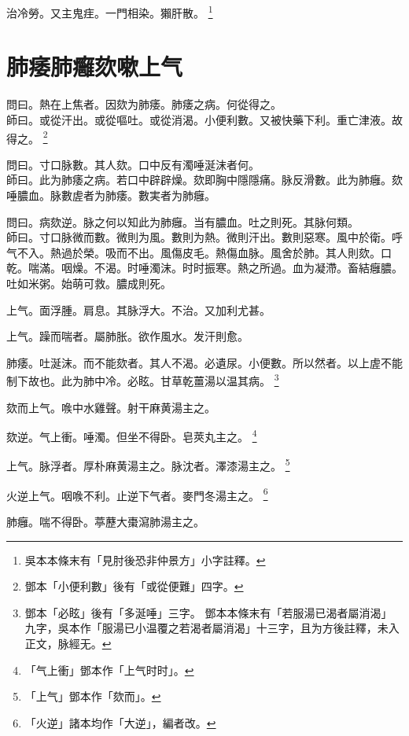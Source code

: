 治冷勞。又主鬼疰。一門相染。獺肝散。
	\footnote{
		吳本本條末有「見肘後恐非仲景方」小字註釋。
	}

\chapter{肺痿肺癰欬嗽上气}

問曰。熱在上焦者。因欬为肺痿。肺痿之病。何從得之。\\
師曰。或從汗出。或從嘔吐。或從消渴。小便利數。又被快藥下利。重亡津液。故得之。
	\footnote{
		鄧本「小便利數」後有「或從便難」四字。
	}

問曰。寸口脉數。其人欬。口中反有濁唾涎沫者何。\\
師曰。此为肺痿之病。若口中辟辟燥。欬即胸中隱隱痛。脉反滑數。此为肺癰。欬唾膿血。脉數虗者为肺痿。數実者为肺癰。

問曰。病欬逆。脉之何以知此为肺癰。当有膿血。吐之則死。其脉何類。\\
師曰。寸口脉微而數。微則为風。數則为熱。微則汗出。數則惡寒。風中於衛。呼气不入。熱過於榮。吸而不出。風傷皮毛。熱傷血脉。風舍於肺。其人則欬。口乾。喘滿。咽燥。不渴。时唾濁沫。时时振寒。熱之所過。血为凝滯。畜結癰膿。吐如米粥。始萌可救。膿成則死。

上气。面浮腫。肩息。其脉浮大。不治。又加利尤甚。

上气。躁而喘者。屬肺胀。欲作風水。发汗則愈。

肺痿。吐涎沫。而不能欬者。其人不渴。必遺尿。小便數。所以然者。以上虗不能制下故也。此为肺中冷。必眩。甘草乾薑湯以温其病。
	\footnote{
		鄧本「必眩」後有「多涎唾」三字。
		鄧本本條末有「若服湯已渴者屬消渴」九字，吳本作「服湯已小温覆之若渴者屬消渴」十三字，且为方後註釋，未入正文，脉經无。
	}

欬而上气。㗋中水雞聲。射干麻黄湯主之。

欬逆。气上衝。唾濁。但坐不得卧。皂莢丸主之。
	\footnote{
		「气上衝」鄧本作「上气时时」。
	}

上气。脉浮者。厚朴麻黄湯主之。脉沈者。澤漆湯主之。
	\footnote{
		「上气」鄧本作「欬而」。
	}


火逆上气。咽㗋不利。止逆下气者。麥門冬湯主之。
	\footnote{
		「火逆」諸本均作「大逆」，編者改。
	}

肺癰。喘不得卧。葶藶大棗瀉肺湯主之。

